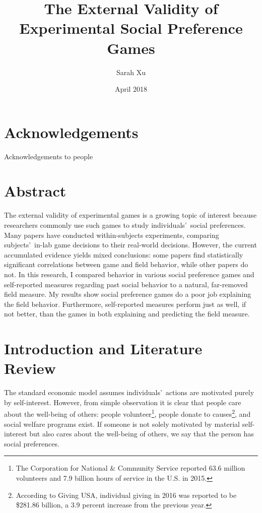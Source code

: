 \documentclass[12pt]{article}
\title{The External Validity of Experimental Social Preference Games}
\author{Sarah Xu}
\date{April 2018}
\begin{document}
\maketitle
\newpage
\singlespacing
\tableofcontents


\newpage


\section*{Acknowledgements}
Acknowledgements to people


\newpage

\section*{Abstract}

\doublespacing
The external validity of experimental games is a growing topic of interest because researchers commonly use such games to study individuals\rq \ social preferences. Many papers have conducted within-subjects experiments, comparing subjects\rq \ in-lab game decisions to their real-world decisions. However, the current accumulated evidence yields mixed conclusions: some papers find statistically significant correlations between game and field behavior, while other papers do not. In this research, I compared behavior in various social preference games and self-reported measures regarding past social behavior to a natural, far-removed field measure. {\color{red}My results show social preference games do a poor job explaining the field behavior. Furthermore, self-reported measures perform just as well, if not better, than the games in both explaining and predicting the field measure.}



\newpage


\doublespacing
\section{Introduction and Literature Review}

The standard economic model assumes individuals\rq \ actions are motivated purely by self-interest. However, from simple observation it is clear that people care about the well-being of others: people volunteer\footnote{The Corporation for National \& Community Service reported 63.6 million volunteers and 7.9 billion hours of service in the U.S. in 2015.}, people donate to causes\footnote{According to Giving USA, individual giving in 2016 was reported to be \$281.86 billion, a 3.9 percent increase from the previous year.}, and social welfare programs exist. If someone is not solely motivated by material self-interest but also cares about the well-being of others, we say that the person has social preferences. 
\end{document}
